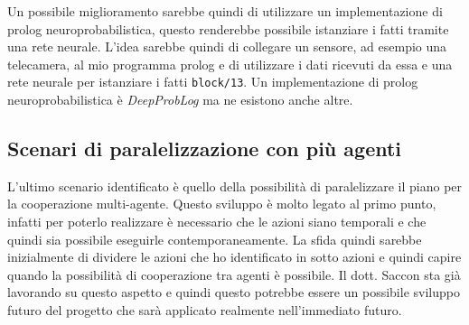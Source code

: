 Un possibile miglioramento sarebbe quindi di utilizzare un implementazione di prolog neuroprobabilistica, questo renderebbe possibile istanziare i fatti tramite una rete neurale.
L'idea sarebbe quindi di collegare un sensore, ad esempio una telecamera, al mio programma prolog e di utilizzare i dati ricevuti da essa e una rete neurale per istanziare i fatti \verb+block/13+.
Un implementazione di prolog neuroprobabilistica è \textit{DeepProbLog} \cite{MANHAEVE2021103504} ma ne esistono anche altre.

\subsection*{Scenari di paralelizzazione con più agenti}
\label{subsec:parallel}
L'ultimo scenario identificato è quello della possibilità di paralelizzare il piano per la cooperazione multi-agente.
Questo sviluppo è molto legato al primo punto, infatti per poterlo realizzare è necessario che le azioni siano temporali e che quindi sia possibile eseguirle contemporaneamente.
La sfida quindi sarebbe inizialmente di dividere le azioni che ho identificato in sotto azioni e quindi capire quando la possibilità di cooperazione tra agenti è possibile. 
Il dott. Saccon sta già lavorando su questo aspetto e quindi questo potrebbe essere un possibile sviluppo futuro del progetto che sarà applicato realmente nell'immediato futuro.
